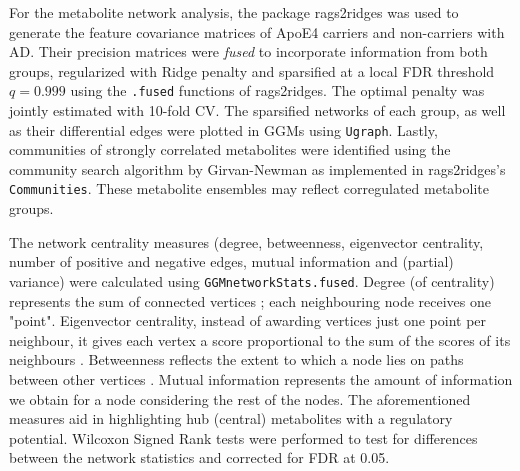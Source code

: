 \documentclass{amsart}
\begin{document}
For the metabolite network analysis, the package \textsf{rags2ridges} \cite{Peeters2022Rags2ridges:Matrices} was used to generate the feature covariance matrices of ApoE4 carriers and non-carriers with AD. Their precision matrices were \textit{fused} to incorporate information from both groups, regularized with Ridge penalty and sparsified at a local FDR threshold $q=0.999$ using the \texttt{.fused} functions of \textsf{rags2ridges}. The optimal penalty was jointly estimated with 10-fold CV. The sparsified networks of each group, as well as their differential edges were plotted in GGMs using \texttt{Ugraph}.  Lastly, communities of strongly correlated metabolites were identified using the community search algorithm by Girvan-Newman \cite{PhysRevE.69.026113} as implemented in \textsf{rags2ridges}'s \texttt{Communities}. These metabolite ensembles may reflect corregulated metabolite groups.

The network centrality measures (degree, betweenness, eigenvector centrality, number of positive and negative edges, mutual information and (partial) variance) were calculated using \texttt{GGMnetworkStats.fused}. Degree (of centrality) represents  the sum of connected vertices \cite{newman2010Networks}; each neighbouring node receives one "point".  Eigenvector centrality, instead of awarding vertices just one point per neighbour, it gives each vertex a score proportional to the sum of the scores of its neighbours \cite{newman2010Networks}. Betweenness reflects the extent to which a node lies on paths between other vertices \cite{newman2010Networks}. Mutual information represents the amount of information we obtain for a node considering the rest of the nodes. The aforementioned measures aid in highlighting hub (central) metabolites with a regulatory potential. Wilcoxon Signed Rank tests were performed to test for differences between the network statistics and corrected for FDR at 0.05.    \clearpage
\end{document}
